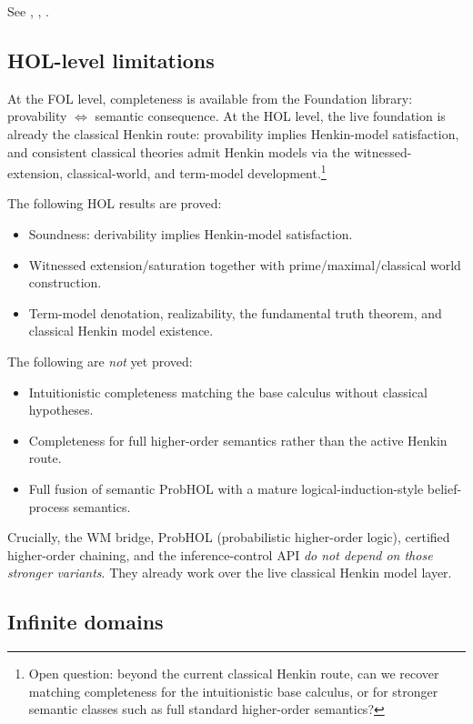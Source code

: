 \documentclass[11pt,openany]{report}
\begin{document}
See ,
,
.

\subsection{HOL-level limitations}

At the FOL level, completeness is available from the Foundation
library: provability $\Leftrightarrow$ semantic consequence.  At
the HOL level, the live foundation is already the classical Henkin
route: provability implies Henkin-model satisfaction, and consistent classical
theories admit Henkin models via the witnessed-extension, classical-world, and
term-model development.\footnote{Open question: beyond the current classical
Henkin route, can we recover matching completeness for the intuitionistic base
calculus, or for stronger semantic classes such as full standard higher-order
semantics?}

The following HOL results are proved:
\begin{itemize}
\item Soundness: derivability implies Henkin-model satisfaction.
\item Witnessed extension/saturation together with prime/maximal/classical world
  construction.
\item Term-model denotation, realizability, the fundamental truth theorem, and
  classical Henkin model existence.
\end{itemize}

The following are \emph{not} yet proved:
\begin{itemize}
\item Intuitionistic completeness matching the base calculus without classical
  hypotheses.
\item Completeness for full higher-order semantics rather than the active
  Henkin route.
\item Full fusion of semantic ProbHOL with a mature logical-induction-style
  belief-process semantics.
\end{itemize}

\noindent
Crucially, the WM bridge, ProbHOL (probabilistic higher-order logic),
certified higher-order chaining, and the inference-control API
\emph{do not depend on those stronger variants}.  They already work over the
live classical Henkin model layer.

\subsection{Infinite domains}
\end{document}
